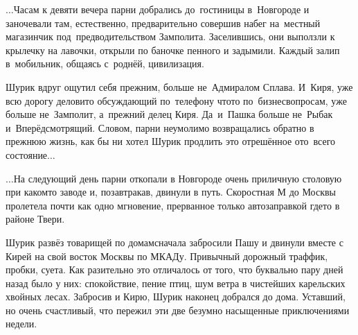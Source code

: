 $\ldots$Часам к девяти вечера парни добрались до~гостиницы в~Новгороде и заночевали там, естественно, предварительно совершив набег на~местный магазинчик под~предводительством Замполита. Заселившись, они выползли к крылечку на лавочки, открыли по баночке пенного и задымили. Каждый залип в~мобильник, общаясь с~роднёй, цивилизация. 

Шурик вдруг ощутил себя прежним, больше не~Адмиралом Сплава. И~Киря, уже всю дорогу деловито обсуждающий по~телефону что\sdash то по~бизнес\sdash вопросам, уже больше не~Замполит, а~прежний делец Киря. Да~и~Пашка больше не~Рыбак и~Вперёдсмотрящий. Словом, парни неумолимо возвращались обратно в прежнюю жизнь, как бы ни хотел Шурик продлить это отрешённое ото~всего состояние$\ldots$

$\ldots$На следующий день парни откопали в Новгороде очень приличную столовую при каком\sdash то заводе и, позавтракав, двинули в путь. Скоростная М до Москвы пролетела почти как одно мгновение, прерванное только автозаправкой где\sdash то в районе Твери.

Шурик развёз товарищей по домам\mdash сначала забросили Пашу и двинули вместе с Кирей на свой восток Москвы по МКАДу. Привычный дорожный траффик, пробки, суета. Как разительно это отличалось от того, что буквально пару дней назад было у них: спокойствие, пение птиц, шум ветра в чистейших карельских хвойных лесах. Забросив и Кирю, Шурик наконец добрался до дома. Уставший, но очень счастливый, что пережил эти две безумно насыщенные приключениями недели.





%
%
%
%
%



\begin{center}
\end{center}
